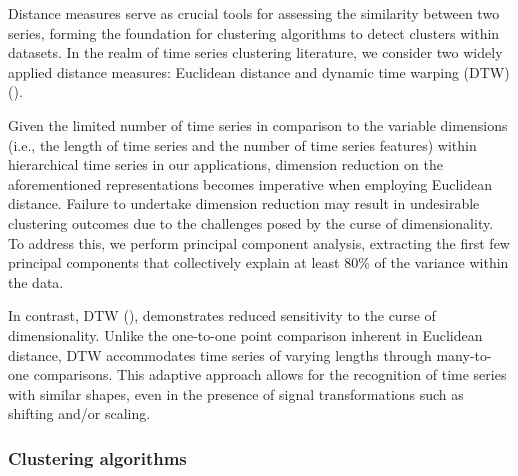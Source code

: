 \documentclass[a4paper,review,12pt,authoryear]{elsarticle}
\begin{document}
Distance measures serve as crucial tools for assessing the similarity between two series, forming the foundation for clustering algorithms to detect clusters within datasets. In the realm of time series clustering literature, we consider two widely applied distance measures: Euclidean distance and dynamic time warping (DTW) (\citealp{warrenliaoClusteringTimeSeries2005}). 

Given the limited number of time series in comparison to the variable dimensions (i.e., the length of time series and the number of time series features) within hierarchical time series in our applications, dimension reduction on the aforementioned representations becomes imperative when employing Euclidean distance. Failure to undertake dimension reduction may result in undesirable clustering outcomes due to the challenges posed by the curse of dimensionality. To address this, we perform principal component analysis, extracting the first few principal components that collectively explain at least 80\% of the variance within the data.

In contrast, DTW (\citealp{sakoeDynamicProgrammingAlgorithm1978}), demonstrates reduced sensitivity to the curse of dimensionality. Unlike the one-to-one point comparison inherent in Euclidean distance, DTW accommodates time series of varying lengths through many-to-one comparisons. This adaptive approach allows for the recognition of time series with similar shapes, even in the presence of signal transformations such as shifting and/or scaling.


\subsubsection*{Clustering algorithms}
\label{sec:clustering}
\end{document}
